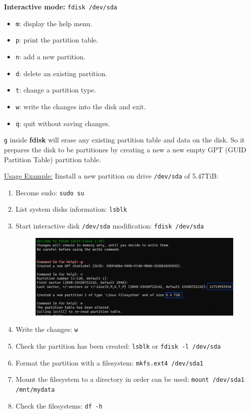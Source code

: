 \documentclass{article}
\newenvironment{blocktemplateIII}[1]{%
    \tcolorbox[beamer,%
    noparskip,breakable,
    ,colframe=Red,%
    colbacklower=LimeGreen!75!LightGreen,%
    title=#1]}%
    {\endtcolorbox}
\begin{document}
\textbf{Interactive mode:} \verb|fdisk /dev/sda|
\begin{itemize}
    \item \verb|m|: display the help menu.
    \item \verb|p|: print the partition table.
    \item \verb|n|: add a new partition.
    \item \verb|d|: delete an existing partition.
    \item \verb|t|: change a partition type.
    \item \verb|w|: write the changes into the disk and exit.
    \item \verb|q|: quit without saving changes.
\end{itemize}

\begin{blocktemplateIII}{Warning}
\verb|g| inside \textbf{fdisk} will erase any existing partition table and data on the disk. So it prepares the disk to be partitiones by creating a new a new empty GPT (GUID Partition Table) partition table. 
\end{blocktemplateIII}

\underline{Usage Example:} Iinstall a new partition on drive \verb|/dev/sda| of 5.47TiB:

\begin{enumerate}
    \item Become sudo: \verb|sudo su|
    \item List system disks information: \verb|lsblk|
    \item Start interactive disk \verb|/dev/sda| modification: \verb|fdisk /dev/sda|
\begin{figure}[H]
    \includegraphics[width=\textwidth]{pictures/fdiskk.png}
    \centering
\end{figure}

    \item Write the changes: \verb|w|
    \item Check the partition has been created: \verb|lsblk| or \verb|fdisk -l /dev/sda|
    \item Format the partition with a filesystem: \verb|mkfs.ext4 /dev/sda1|
    \item Mount the filesystem to a directory in order can be used: \verb|mount /dev/sda1 /mnt/mydata|
    \item Check the filesystems: \verb|df -h|
\end{enumerate}
\end{document}
